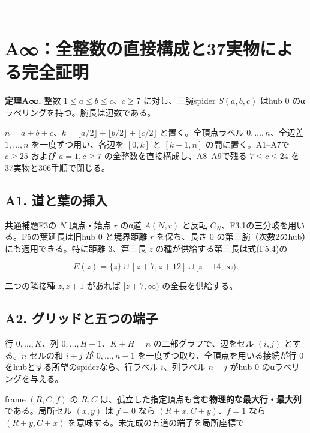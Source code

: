 \documentclass[
  10pt,
  a4paper,
]{article}
\begin{document}
□

\section{A∞：全整数の直接構成と37実物による完全証明}\label{aux5168ux6574ux6570ux306eux76f4ux63a5ux69cbux6210ux306837ux5b9fux7269ux306bux3088ux308bux5b8cux5168ux8a3cux660e}

\textbf{定理A∞.} 整数 \(1\le a\le b\le c\)、\(c\ge7\) に対し、三腕spider
\(S(a,b,c)\) はhub \(0\) のαラベリングを持つ。腕長は辺数である。

\(n=a+b+c\)、\(k=\lfloor a/2\rfloor+\lfloor b/2\rfloor+\lfloor c/2\rfloor\)
と置く。全頂点ラベル \(0,\ldots,n\)、全辺差 \(1,\ldots,n\)
を一度ずつ用い、各辺を \([0,k]\) と \([k+1,n]\) の間に置く。A1--A7で
\(c\ge25\) および \(a=1,c\ge7\) の全整数を直接構成し、A8--A9で残る
\(7\le c\le24\) を37実物と306手順で閉じる。

\subsection{A1.
道と葉の挿入}\label{a1.-ux9053ux3068ux8449ux306eux633fux5165}

共通補題F3の \(N\) 頂点・始点 \(r\) のα道 \(A(N,r)\) と反転
\(C_N\)、F3.1の三分岐を用いる。F5の葉延長は旧hub \(0\) と境界距離 \(r\)
を保ち、長さ \(0\) の第三腕（次数2のhub）にも適用できる。特に距離
\(3\)、第三長 \(z\) の種が供給する第三長は式(F5.4)の

\[
E(z)=\{z\}\cup[z+7,z+12]\cup[z+14,\infty).
\]

二つの隣接種 \(z,z+1\) があれば \([z+7,\infty)\) の全長を供給する。

\subsection{A2.
グリッドと五つの端子}\label{a2.-ux30b0ux30eaux30c3ux30c9ux3068ux4e94ux3064ux306eux7aefux5b50}

行 \(0,\ldots,K\)、列 \(0,\ldots,H-1\)、\(K+H=n\)
の二部グラフで、辺をセル \((i,j)\) とする。\(n\) セルの和 \(i+j\) が
\(0,\ldots,n-1\) を一度ずつ取り、全頂点を用いる接続が行 \(0\)
をhubとする所望のspiderなら、行ラベル \(i\)、列ラベル \(n-j\) がhub
\(0\) のαラベリングを与える。

frame \((R,C,f)\) の \(R,C\)
は、孤立した指定頂点も含む\textbf{物理的な最大行・最大列}である。局所セル
\((x,y)\) は \(f=0\) なら \((R+x,C+y)\)、\(f=1\) なら \((R+y,C+x)\)
を意味する。未完成の五道の端子を局所座標で
\end{document}
